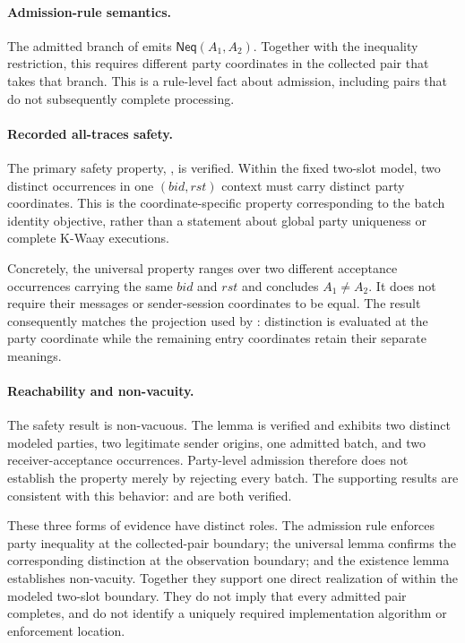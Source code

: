 \paragraph{Admission-rule semantics.}
The admitted branch of  emits
\(\mathsf{Neq}(A_1,A_2)\). Together with the inequality restriction, this
requires different party coordinates in the collected pair that takes that
branch. This is a rule-level fact about admission, including pairs that do
not subsequently complete processing.

\paragraph{Recorded all-traces safety.}
The primary safety property,
, is verified.
Within the fixed two-slot model, two distinct \receiveraccept occurrences in
one \((\mathit{bid},\mathit{rst})\) context must carry distinct party
coordinates. This is the coordinate-specific property corresponding to the
batch identity objective, rather than a statement about global party
uniqueness or complete K-Waay executions.

Concretely, the universal property ranges over two different acceptance
occurrences carrying the same \(\mathit{bid}\) and \(\mathit{rst}\) and
concludes $A_1\neq A_2$. It does not require their messages or sender-session
coordinates to be equal. The result consequently matches the projection used
by \distinctparty: distinction is evaluated at the party coordinate while the
remaining entry coordinates retain their separate meanings.

\paragraph{Reachability and non-vacuity.}
The safety result is non-vacuous. The lemma
 is verified and exhibits
two distinct modeled parties, two legitimate sender origins, one admitted
batch, and two receiver-acceptance occurrences. Party-level admission
therefore does not establish the property merely by rejecting every batch.
The supporting results are consistent with this behavior:
 and
 are both verified.

These three forms of evidence have distinct roles. The admission rule enforces
party inequality at the collected-pair boundary; the universal lemma confirms
the corresponding distinction at the \receiveraccept observation boundary;
and the existence lemma establishes non-vacuity. Together they support one
direct realization of \distinctparty within the modeled two-slot boundary.
They do not imply that every admitted pair completes, and do not identify a
uniquely required implementation algorithm or enforcement location.

